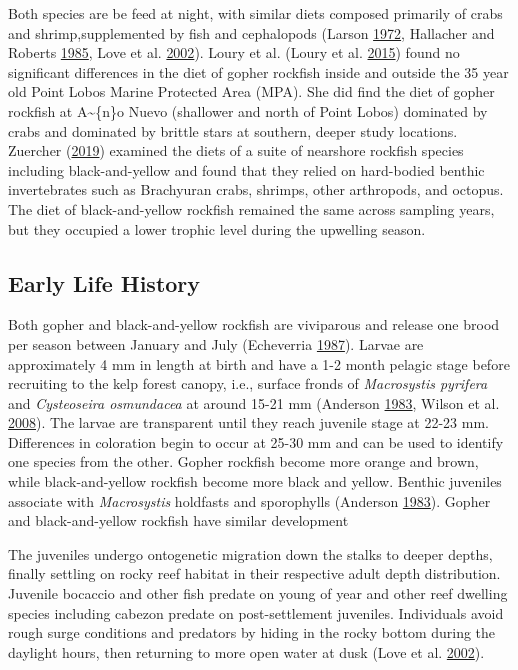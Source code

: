 \documentclass[12pt,]{article}
\begin{document}
Both species are be feed at night, with similar diets composed primarily
of crabs and shrimp,supplemented by fish and cephalopods (Larson
\protect\hyperlink{ref-Larson1972}{1972}, Hallacher and Roberts
\protect\hyperlink{ref-Hallacher1985}{1985}, Love et al.
\protect\hyperlink{ref-Love2002}{2002}). Loury et al. (Loury et al.
\protect\hyperlink{ref-Loury2015}{2015}) found no significant
differences in the diet of gopher rockfish inside and outside the 35
year old Point Lobos Marine Protected Area (MPA). She did find the diet
of gopher rockfish at A\textasciitilde{}\{n\}o Nuevo (shallower and
north of Point Lobos) dominated by crabs and dominated by brittle stars
at southern, deeper study locations. Zuercher
(\protect\hyperlink{ref-Zuercher2019}{2019}) examined the diets of a
suite of nearshore rockfish species including black-and-yellow and found
that they relied on hard-bodied benthic invertebrates such as Brachyuran
crabs, shrimps, other arthropods, and octopus. The diet of
black-and-yellow rockfish remained the same across sampling years, but
they occupied a lower trophic level during the upwelling season.

\subsection{Early Life History}\label{early-life-history}

Both gopher and black-and-yellow rockfish are viviparous and release one
brood per season between January and July (Echeverria
\protect\hyperlink{ref-Echeverria1987}{1987}). Larvae are approximately
4 mm in length at birth and have a 1-2 month pelagic stage before
recruiting to the kelp forest canopy, i.e., surface fronds of
\emph{Macrosystis pyrifera} and \emph{Cysteoseira osmundacea} at around
15-21 mm (Anderson \protect\hyperlink{ref-Anderson1983}{1983}, Wilson et
al. \protect\hyperlink{ref-Wilson2008}{2008}). The larvae are
transparent until they reach juvenile stage at 22-23 mm. Differences in
coloration begin to occur at 25-30 mm and can be used to identify one
species from the other. Gopher rockfish become more orange and brown,
while black-and-yellow rockfish become more black and yellow. Benthic
juveniles associate with \emph{Macrosystis} holdfasts and sporophylls
(Anderson \protect\hyperlink{ref-Anderson1983}{1983}). Gopher and
black-and-yellow rockfish have similar development

The juveniles undergo ontogenetic migration down the stalks to deeper
depths, finally settling on rocky reef habitat in their respective adult
depth distribution. Juvenile bocaccio and other fish predate on young of
year and other reef dwelling species including cabezon predate on
post-settlement juveniles. Individuals avoid rough surge conditions and
predators by hiding in the rocky bottom during the daylight hours, then
returning to more open water at dusk (Love et al.
\protect\hyperlink{ref-Love2002}{2002}).
\end{document}
